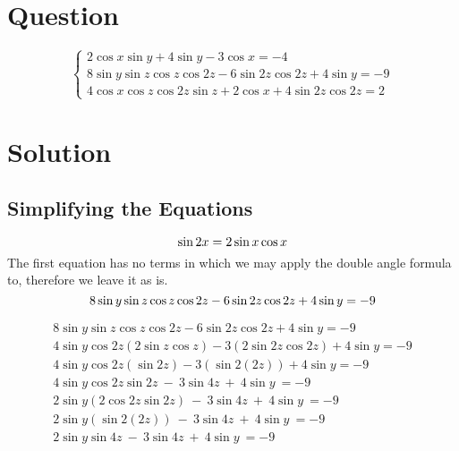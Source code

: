 \documentclass[a4paper,12pt]{article}
\begin{document}
\section*{Question}
$$
\begin{cases}
    2\cos x\sin y + 4\sin y - 3\cos x = -4 \\
    8\sin y\sin z\cos z\cos 2z - 6\sin 2z\cos 2z + 4\sin y = -9 \\
    4\cos x\cos z\cos 2z\sin z + 2\cos x + 4\sin 2z\cos 2z = 2
\end{cases}
$$

\section*{Solution}
\subsection*{Simplifying the Equations}
$$\sin 2x = 2\sin x\cos x \\$$
The first equation has no terms in which we may apply the double angle formula to, therefore we leave it as is.
 $$8\sin y\sin z\cos z\cos 2z - 6\sin 2z\cos 2z + 4\sin y = -9 \\$$

\begin{equation}
    \begin{split}
        8\sin y\sin z\cos z\cos2z-6\sin2z\cos2z+4\sin y=-9 \\
        4\sin y\cos2z\left(2\sin z\cos z\right)-3\left(2\sin2z\cos2z\right)+4\sin y=-9 \\
        4\sin y\cos2z\left(\sin2z\right)-3\left(\sin2\left(2z\right)\right)+4\sin y=-9 \\
        4\sin y\cos2z\sin2z\ -\ 3\sin4z\ +\ 4\sin y\ =-9 \\
        2\sin y\left(2\cos2z\sin2z\right)\ -\ 3\sin4z\ +\ 4\sin y\ =-9 \\
        2\sin y\left(\sin2\left(2z\right)\right)\ -\ 3\sin4z\ +\ 4\sin y\ =-9 \\
        2\sin y\sin4z\ -\ 3\sin4z\ +\ 4\sin y\ =-9 \\
    \end{split}
\end{equation}
\end{document}
